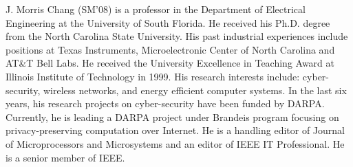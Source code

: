 \documentclass[journal]{IEEEtai}
\begin{document}
\begin{IEEEbiography}{J. Morris Chang}
	(SM'08) is a professor in the Department of Electrical Engineering at the University of South Florida. He received his Ph.D. degree from the North Carolina State University. His past industrial experiences include positions at Texas Instruments, Microelectronic Center of North Carolina and AT\&T Bell Labs. He received the University Excellence in Teaching Award at Illinois Institute of Technology in 1999. His research interests include: cyber-security, wireless networks, and energy efficient computer systems. In the last six years, his research projects on cyber-security have been funded by DARPA. Currently, he is leading a DARPA project under Brandeis program focusing on privacy-preserving computation over Internet. He is a handling editor of Journal of Microprocessors and Microsystems and an editor of IEEE IT Professional. He is a senior member of IEEE.
\end{IEEEbiography}

%
\end{document}
